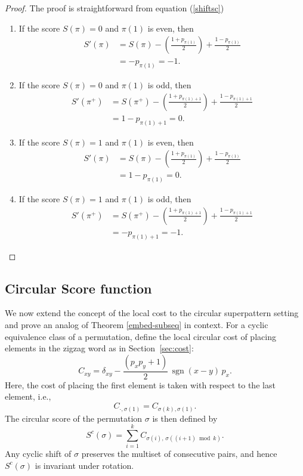 \documentclass[a4paper,12pt]{article}
\newcommand{\sign}{\operatorname{sgn}}
\theoremstyle{definition}
\numberwithin{equation}{section}
\begin{document}
\begin{proof}
  The proof is straightforward from equation (\ref{shiftsc})
    \begin{enumerate}
    \item If the score $S(\pi) = 0$ and $\pi(1)$ is even, then 
    \begin{align*}
        S'(\pi) &= S(\pi) - \left(\frac{1+ p_{\pi(1)}}{2}\right) + \frac{1 - p_{\pi(1)}}{2} \\
        &= -p_{\pi(1)} =-1. 
    \end{align*}
    \item  If the score $S(\pi) = 0$ and $\pi(1)$ is odd, then 
       \begin{align*}
        S'(\pi^+) &= S(\pi^+) - \left(\frac{1+ p_{\pi(1)+1}}{2}\right) + \frac{1 - p_{\pi(1)+1}}{2} \\
        &= 1-p_{\pi(1)+1} = 0.  
    \end{align*}
    
    \item If the score $S(\pi) = 1$ and $\pi(1)$ is even, then 
       \begin{align*}
        S'(\pi) &= S(\pi) - \left(\frac{1+ p_{\pi(1)}}{2}\right) + \frac{1 - p_{\pi(1)}}{2} \\
        &= 1-p_{\pi(1)} = 0.  
    \end{align*}

    \item  If the score $S(\pi) = 1$ and $\pi(1)$ is odd, then 
       \begin{align*}
        S'(\pi^+) &= S(\pi^+) - \left(\frac{1+ p_{\pi(1)+1}}{2}\right) + \frac{1 - p_{\pi(1)+1}}{2} \\
        &= -p_{\pi(1)+1} = -1.  
    \end{align*}
    \end{enumerate}
\end{proof}


\subsection{Circular Score function}
We now extend the concept of the local cost to the circular superpattern setting and prove an analog of Theorem \ref{embed-subseq} in context. 
For a cyclic equivalence class of a permutation, define the local circular cost of placing elements in the zigzag word as in Section~\ref{sec:cost}:
\[
C_{xy} =  \delta_{xy}-\frac{(p_x p_y + 1)}{2} \, \sign(x-y) \, p_x.
\]  
Here, the cost of placing the first element is taken with respect to the last element, i.e.,
\[
C_{\cdot,\sigma(1)} = C_{\sigma(k),\sigma(1)}.
\]
The circular score of the permutation $\sigma$ is then defined by
\[
S^c(\sigma) = \sum_{i=1}^{k} C_{\sigma(i),\, \sigma((i+1) \bmod k)}.
\]
Any cyclic shift of $\sigma$ preserves the multiset of consecutive pairs, and hence $S^c(\sigma)$ is invariant under rotation.  
\end{document}
